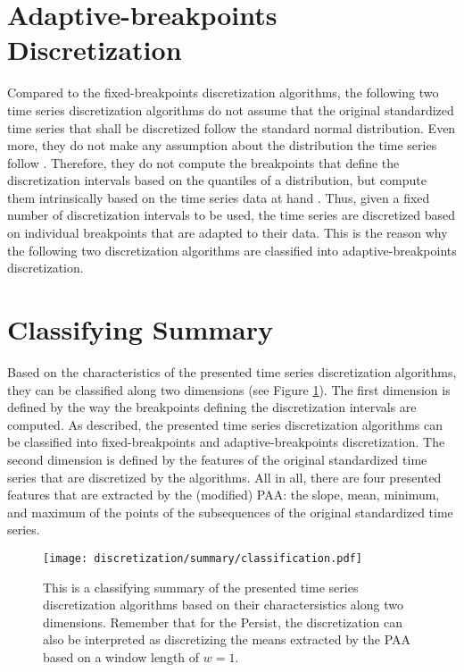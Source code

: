 \section{Adaptive-breakpoints Discretization}
Compared to the fixed-breakpoints discretization algorithms, the following two time series discretization algorithms do not assume that the original standardized time series that shall be discretized follow the standard normal distribution. Even more, they do not make any assumption about the distribution the time series follow \cite{A_SAX, Persist}. Therefore, they do not compute the breakpoints that define the discretization intervals based on the quantiles of a distribution, but compute them intrinsically based on the time series data at hand \cite{A_SAX, Persist}. Thus, given a fixed number of discretization intervals to be used, the time series are discretized based on individual breakpoints that are adapted to their data. This is the reason why the following two discretization algorithms are classified into adaptive-breakpoints discretization.


\section{Classifying Summary}
Based on the characteristics of the presented time series discretization algorithms, they can be classified along two dimensions (see Figure \ref{fig:summary}). The first dimension is defined by the way the breakpoints defining the discretization intervals are computed. As described, the presented time series discretization algorithms can be classified into fixed-breakpoints and adaptive-breakpoints discretization. The second dimension is defined by the features of the original standardized time series that are discretized by the algorithms. All in all, there are four presented features that are extracted by the (modified) \ac{PAA}: the slope, mean, minimum, and maximum of the points of the subsequences of the original standardized time series.
\newpage
\begin{figure}[htb]
\centering
\texttt{[image: discretization/summary/classification.pdf]}
\caption[Time Series Discretization Algorithms - Classifying Summary]{This is a classifying summary of the presented time series discretization algorithms based on their charactersistics along two dimensions. Remember that for the Persist, the discretization can also be interpreted as discretizing the means extracted by the \ac{PAA} based on a window length of $w = 1$.}
\label{fig:summary}
\end{figure}







